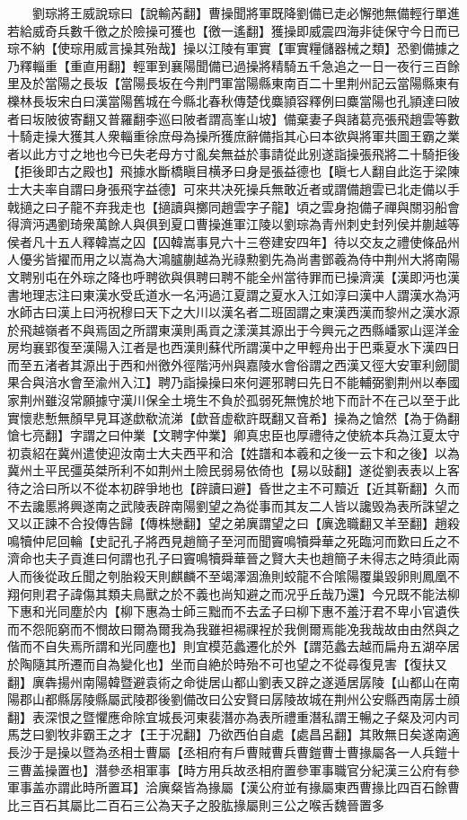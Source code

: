 　　劉琮將王威說琮曰【說輸芮翻】曹操聞將軍既降劉備已走必懈弛無備輕行單進若給威奇兵數千徼之於險操可獲也【徼一遙翻】獲操即威震四海非徒保守今日而已琮不納【使琮用威言操其殆哉】操以江陵有軍實【軍實糧儲器械之類】恐劉備據之乃釋輜重【重直用翻】輕軍到襄陽聞備已過操將精騎五千急追之一日一夜行三百餘里及於當陽之長坂【當陽長坂在今荆門軍當陽縣東南百二十里荆州記云當陽縣東有櫟林長坂宋白曰漢當陽舊城在今縣北春秋傳楚伐麋頴容釋例曰麋當陽也孔頴達曰陂者曰坂陂彼寄翻又普羅翻李巡曰陂者謂高峯山坡】備棄妻子與諸葛亮張飛趙雲等數十騎走操大獲其人衆輜重徐庶母為操所獲庶辭備指其心曰本欲與將軍共圖王霸之業者以此方寸之地也今已失老母方寸亂矣無益於事請從此别遂詣操張飛將二十騎拒後【拒後即古之殿也】飛據水斷橋瞋目横矛曰身是張益德也【瞋七人翻自此迄于梁陳士大夫率自謂曰身張飛字益德】可來共决死操兵無敢近者或謂備趙雲已北走備以手戟擿之曰子龍不弃我走也【擿讀與擲同趙雲字子龍】頃之雲身抱備子禪與關羽船會得濟沔遇劉琦衆萬餘人與俱到夏口曹操進軍江陵以劉琮為青州刺史封列侯并蒯越等侯者凡十五人釋韓嵩之囚【囚韓嵩事見六十三卷建安四年】待以交友之禮使條品州人優劣皆擢而用之以嵩為大鴻臚蒯越為光祿勲劉先為尚書鄧羲為侍中荆州大將南陽文聘别屯在外琮之降也呼聘欲與俱聘曰聘不能全州當待罪而已操濟漢【漢即沔也漢書地理志注曰東漢水受氐道水一名沔過江夏謂之夏水入江如淳曰漢中人謂漢水為沔水師古曰漢上曰沔祝穆曰天下之大川以漢名者二班固謂之東漢西漢而黎州之漢水源於飛越嶺者不與焉固之所謂東漢則禹貢之漾漢其源出于今興元之西縣嶓冢山逕洋金房均襄郢復至漢陽入江者是也西漢則蘇代所謂漢中之甲輕舟出于巴乘夏水下漢四日而至五渚者其源出于西和州徼外徑階沔州與嘉陵水會俗謂之西漢又徑大安軍利劒閬果合與涪水會至渝州入江】聘乃詣操操曰來何遲邪聘曰先日不能輔弼劉荆州以奉國家荆州雖沒常願據守漢川保全土境生不負於孤弱死無愧於地下而計不在己以至于此實懷悲慙無顏早見耳遂歔欷流涕【歔音虚欷許既翻又音希】操為之愴然【為于偽翻愴七亮翻】字謂之曰仲業【文聘字仲業】卿真忠臣也厚禮待之使統本兵為江夏太守初袁紹在冀州遣使迎汝南士大夫西平和洽【姓譜和本羲和之後一云卞和之後】以為冀州土平民彊英桀所利不如荆州土險民弱易依倚也【易以䜴翻】遂從劉表表以上客待之洽曰所以不從本初辟爭地也【辟讀曰避】昏世之主不可黷近【近其靳翻】久而不去讒慝將興遂南之武陵表辟南陽劉望之為從事而其友二人皆以讒毁為表所誅望之又以正諫不合投傳告歸【傳株戀翻】望之弟廙謂望之曰【廙逸職翻又羊至翻】趙殺鳴犢仲尼回輪【史記孔子將西見趙簡子至河而聞竇鳴犢舜華之死臨河而歎曰丘之不濟命也夫子貢進曰何謂也孔子曰竇鳴犢舜華晉之賢大夫也趙簡子未得志之時須此兩人而後從政丘聞之刳胎殺天則麒麟不至竭澤涸漁則蛟龍不合隂陽覆巢毀卵則鳳凰不翔何則君子諱傷其類夫鳥獸之於不義也尚知避之而况乎丘哉乃還】今兄既不能法柳下惠和光同塵於内【柳下惠為士師三黜而不去孟子曰柳下惠不羞汙君不卑小官遺佚而不怨阨窮而不憫故曰爾為爾我為我雖袒裼祼裎於我側爾焉能凂我哉故由由然與之偕而不自失焉所謂和光同塵也】則宜模范蠡遷化於外【謂范蠡去越而扁舟五湖卒居於陶隨其所遷而自為變化也】坐而自絶於時殆不可也望之不從尋復見害【復扶又翻】廙犇揚州南陽韓暨避袁術之命徙居山都山劉表又辟之遂遁居孱陵【山都山在南陽郡山都縣孱陵縣屬武陵郡後劉備改曰公安賢曰孱陵故城在荆州公安縣西南孱士顔翻】表深恨之暨懼應命除宜城長河東裴潛亦為表所禮重潛私謂王暢之子粲及河内司馬芝曰劉牧非霸王之才【王于况翻】乃欲西伯自處【處昌呂翻】其敗無日矣遂南適長沙于是操以暨為丞相士曹屬【丞相府有戶曹賊曹兵曹鎧曹士曹掾屬各一人兵鎧十三曹盖操置也】潛參丞相軍事【時方用兵故丞相府置參軍事職官分紀漢三公府有參軍事盖亦謂此時所置耳】洽廙粲皆為掾屬【漢公府並有掾屬東西曹掾比四百石餘曹比三百石其屬比二百石三公為天子之股肱掾屬則三公之喉舌魏晉置多